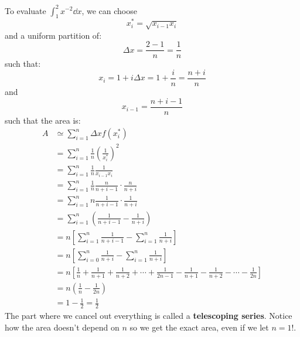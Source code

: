 \begin{itemize}
\begin{example}
\begin{equation}
        \end{equation}
    \end{example}
    \begin{example}
        To evaluate $\int_1^2 x^{-2} \dd{x}$, we can choose
        \begin{equation}
            x_i^* = \sqrt{x_{i-1}x_i}
        \end{equation}
        and a uniform partition of:
        \begin{equation}
            \Delta x = \frac{2-1}{n} = \frac{1}{n}
        \end{equation}
        such that:
        \begin{equation}
            x_i = 1+i\Delta x = 1 + \frac{i}{n} = \frac{n+i}{n}
        \end{equation}
        and
        \begin{equation}
            x_{i-1} = \frac{n+i-1}{n}
        \end{equation}
        such that the area is:
        \begin{align*}
            A &\simeq \sum_{i=1}^n \Delta xf(x_i^*) \\ 
            &= \sum_{i=1}^n \frac{1}{n} \left(\frac{1}{x_i^*}\right)^2 \\ 
            &= \sum_{i=1}^n \frac{1}{n} \frac{1}{x_{i-1}x_i} \\ 
            &= \sum_{i=1}^n \frac{1}{n} \frac{n}{n+i-1}\cdot \frac{n}{n+i} \\
            &= \sum_{i=1}^n n \frac{1}{n+i-1} \cdot \frac{1}{n+i} \\ 
            &= \sum_{i=1}^n \left(\frac{1}{n+i-1}-\frac{1}{n+i}\right) \\ 
            &= n\left[\sum_{i=1}^n \frac{1}{n+i-1} - \sum_{i=1}^n \frac{1}{n+i}\right] \\ 
            &= n\left[\sum_{i=0}^n \frac{1}{n+i} - \sum_{i=1}^n \frac{1}{n+i}\right] \\ 
            &= n\left[\frac{1}{n}+\frac{1}{n+1}+\frac{1}{n+2}+\cdots+\frac{1}{2n-1}-\frac{1}{n+1}-\frac{1}{n+2}-\cdots-\frac{1}{2n}\right] \\ 
            &=n\left(\frac{1}{n}-\frac{1}{2n}\right) \\ 
            &= 1 - \frac{1}{2} = \frac{1}{2}
        \end{align*}
        The part where we cancel out everything is called a \textbf{telescoping series}. Notice how the area doesn't depend on $n$ so we get the exact area, even if we let $n=1$!.
    \end{example}

\end{itemize}
